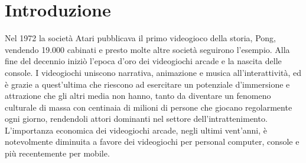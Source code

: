 %
%

\chapter*{Introduzione}



Nel 1972 la società Atari pubblicava il primo videogioco della storia, Pong, vendendo 19.000 cabinati e presto molte altre società seguirono l'esempio. Alla fine del decennio iniziò l'epoca d'oro dei videogiochi arcade e la nascita delle console. I videogiochi uniscono narrativa, animazione e musica all'interattività, ed è grazie a quest'ultima che riescono ad esercitare un potenziale d'immersione e attrazione che gli altri media non hanno, tanto da diventare un fenomeno culturale di massa con centinaia di milioni di persone che giocano regolarmente ogni giorno, rendendoli attori dominanti nel settore dell'intrattenimento. L'importanza economica dei videogiochi arcade, negli ultimi vent'anni, è notevolmente diminuita a favore dei videogiochi per personal computer, console e più recentemente per mobile.

